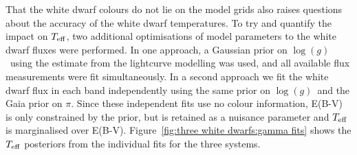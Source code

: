That the white dwarf colours do not lie on the model grids also raises questions about the accuracy of the white dwarf temperatures. To try and quantify the impact on $T_{\rm eff}$, two additional optimisations of model parameters to the white dwarf fluxes were performed.
In one approach, a Gaussian prior on $\log (g)$\ using the estimate from the lightcurve modelling was used, and all available flux measurements were fit simultaneously.
In a second approach we fit the white dwarf flux in each band independently using the same prior on $\log (g)$\ and the Gaia prior on $\pi$. Since these independent fits use no colour information, E(B-V) is only constrained by the prior, but is retained as a nuisance parameter and $T_{\rm eff}$ is marginalised over E(B-V). Figure~\ref{fig:three white dwarfs:gamma fits} shows the $T_{\rm eff}$ posteriors from the individual fits for the three systems.

